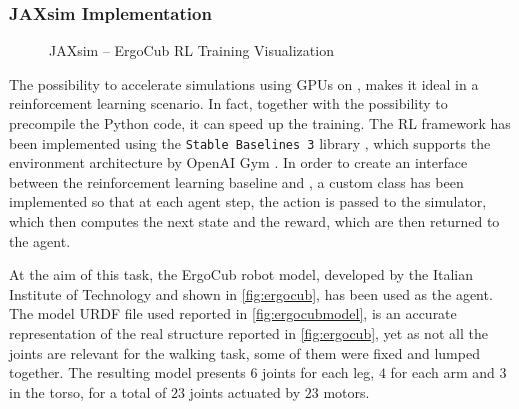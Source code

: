 \subsubsection{JAXsim Implementation}

\begin{figure}
    \centering
    \caption{JAXsim -- ErgoCub RL Training Visualization}
    \label{fig:ergocubtraining}
\end{figure}

The possibility to accelerate simulations using \ac{GPU}s on \jaxsim, makes it ideal in a reinforcement learning scenario. In fact, together with the possibility to precompile the Python code, it can speed up the training. The \ac{RL} framework has been implemented using the \texttt{Stable Baselines 3} library \citep{raffin_stable-baselines3_2021}, which supports the environment architecture by OpenAI Gym \citep{brockman_openai_2016}. In order to create an interface between the reinforcement learning baseline and \jaxsim, a custom class has been implemented so that at each agent step, the action is passed to the simulator, which then computes the next state and the reward, which are then returned to the agent.

At the aim of this task, the ErgoCub robot model, developed by the Italian Institute of Technology and shown in \cref{fig:ergocub}, has been used as the agent. The model \ac{URDF} file used reported in \cref{fig:ergocubmodel}, is an accurate representation of the real structure reported in \cref{fig:ergocub}, yet as not all the joints are relevant for the walking task, some of them were fixed and lumped together. The resulting model presents $6$ joints for each leg, $4$ for each arm and $3$ in the torso, for a total of $23$ joints actuated by $23$ motors.

